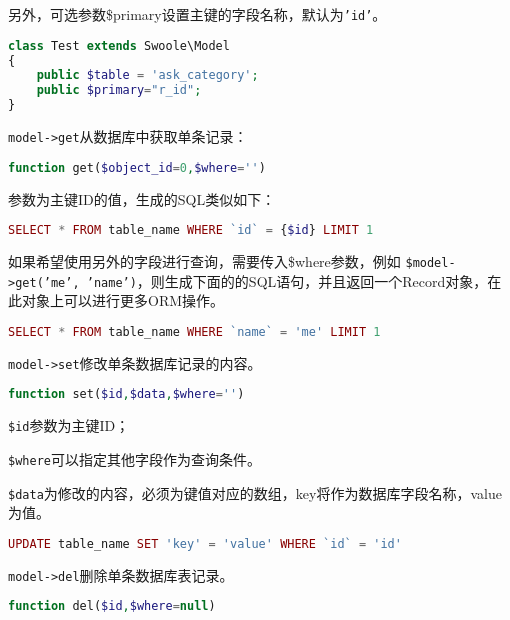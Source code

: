 另外，可选参数\$primary设置主键的字段名称，默认为\texttt{'id'}。

\begin{lstlisting}[language=PHP]
class Test extends Swoole\Model
{
	public $table = 'ask_category';
	public $primary="r_id";
}

\end{lstlisting}

\texttt{model->get}从数据库中获取单条记录：

\begin{lstlisting}[language=PHP]
function get($object_id=0,$where='')
\end{lstlisting}

参数为主键ID的值，生成的SQL类似如下：


\begin{lstlisting}[language=PHP]
SELECT * FROM table_name WHERE `id` = {$id} LIMIT 1
\end{lstlisting}

如果希望使用另外的字段进行查询，需要传入\$where参数，例如 \texttt{\$model->get('me', 'name')}，则生成下面的的SQL语句，并且返回一个Record对象，在此对象上可以进行更多ORM操作。

\begin{lstlisting}[language=PHP]
SELECT * FROM table_name WHERE `name` = 'me' LIMIT 1
\end{lstlisting}

\texttt{model->set}修改单条数据库记录的内容。


\begin{lstlisting}[language=PHP]
function set($id,$data,$where='')
\end{lstlisting}

\begin{compactitem}
\item \texttt{\$id}参数为主键ID；
\item \texttt{\$where}可以指定其他字段作为查询条件。
\item \texttt{\$data}为修改的内容，必须为键值对应的数组，key将作为数据库字段名称，value为值。
\end{compactitem}


\begin{lstlisting}[language=PHP]
UPDATE table_name SET 'key' = 'value' WHERE `id` = 'id'
\end{lstlisting}

\texttt{model->del}删除单条数据库表记录。

\begin{lstlisting}[language=PHP]
function del($id,$where=null)
\end{lstlisting}


